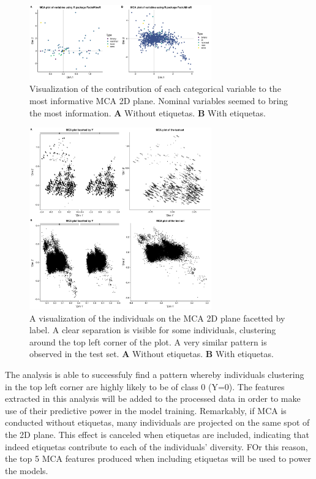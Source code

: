 \documentclass{article}\usepackage[]{graphicx}\usepackage[]{color}
\begin{document}
\begin{figure}[!h]
\centering
\includegraphics[width=0.7\textwidth]{plots/mca_variables_combined}
\caption{Visualization of the contribution of each categorical variable to the most informative MCA 2D plane. Nominal variables seemed to bring the most information. \textbf{A} Without etiquetas. \textbf{B} With etiquetas.}
\label{fig:mca_variables}
\end{figure}

\begin{figure}[!h]
\centering
\includegraphics[width=0.7\textwidth]{plots/mca_obs_Y_facet_all_combined}
\caption{A visualization of the individuals on the MCA 2D plane facetted by label. A clear separation is visible for some individuals, clustering around the top left corner of the plot. A very similar pattern is observed in the test set. \textbf{A} Without etiquetas. \textbf{B} With etiquetas.}
\label{fig:mca_obs_Y}
\end{figure}

The analysis is able to successfuly find a pattern whereby individuals clustering in the top left corner are highly likely to be of class 0 (Y=0). The features extracted in this analysis will be added to the processed data in order to make use of their predictive power in the model training. Remarkably, if MCA is conducted without etiquetas, many individuals are projected on the same spot of the 2D plane. This effect is canceled when etiquetas are included, indicating that indeed etiquetas contribute to each of the individuals' diversity. FOr this reason, the top 5 MCA features produced when including etiquetas will be used to power the models.
\end{document}
